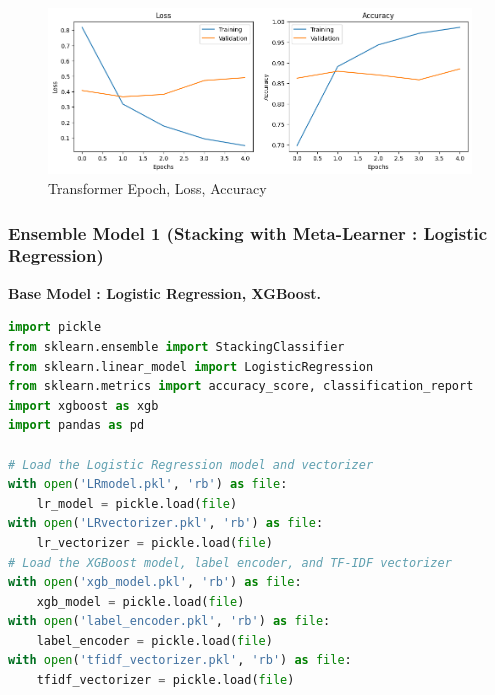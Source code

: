 \begin{figure}[h!]  
    \centering
    \includegraphics[width=1.0\textwidth]{Images/T LOSS EPOCH.png}  
    \caption{Transformer Epoch, Loss, Accuracy}
    \label{lstm t epch}  %
\end{figure}

\pagebreak

\subsubsection{Ensemble Model 1 (Stacking with Meta-Learner : Logistic Regression)}
\noindent
\textbf{Base Model : Logistic Regression, XGBoost. }

\begin{tcolorbox}[colback=gray!5!white, colframe=gray!80!black, boxrule=0.5pt, title=Ensemble Model 1 : Loading and Preprocessing]
    \begin{lstlisting}[language=Python]
import pickle
from sklearn.ensemble import StackingClassifier
from sklearn.linear_model import LogisticRegression
from sklearn.metrics import accuracy_score, classification_report
import xgboost as xgb
import pandas as pd

# Load the Logistic Regression model and vectorizer
with open('LRmodel.pkl', 'rb') as file:
    lr_model = pickle.load(file)
with open('LRvectorizer.pkl', 'rb') as file:
    lr_vectorizer = pickle.load(file)
# Load the XGBoost model, label encoder, and TF-IDF vectorizer
with open('xgb_model.pkl', 'rb') as file:
    xgb_model = pickle.load(file)
with open('label_encoder.pkl', 'rb') as file:
    label_encoder = pickle.load(file)
with open('tfidf_vectorizer.pkl', 'rb') as file:
    tfidf_vectorizer = pickle.load(file)
    \end{lstlisting}
\end{tcolorbox}

